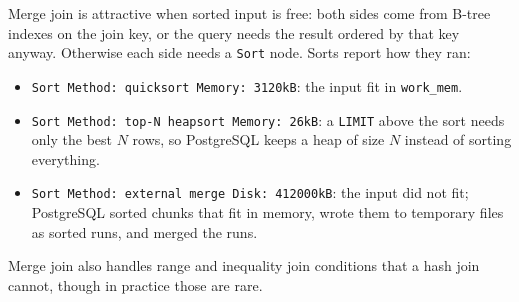 Merge join is attractive when sorted input is free: both sides come from B-tree indexes on the join key, or the query needs the result ordered by that key anyway. Otherwise each side needs a \texttt{Sort} node. Sorts report how they ran:
\begin{itemize}
  \item \texttt{Sort Method: quicksort Memory: 3120kB}: the input fit in \texttt{work\_mem}.
  \item \texttt{Sort Method: top-N heapsort Memory: 26kB}: a \texttt{LIMIT} above the sort needs only the best $N$ rows, so PostgreSQL keeps a heap of size $N$ instead of sorting everything.
  \item \texttt{Sort Method: external merge Disk: 412000kB}: the input did not fit; PostgreSQL sorted chunks that fit in memory, wrote them to temporary files as sorted runs, and merged the runs.
\end{itemize}
Merge join also handles range and inequality join conditions that a hash join cannot, though in practice those are rare.

